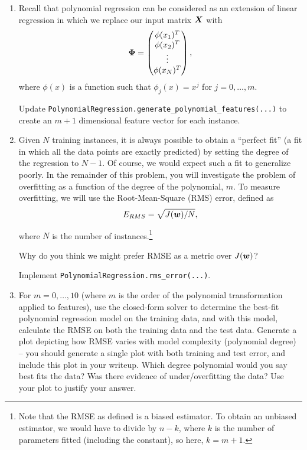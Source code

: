 \documentclass[11pt]{article}
\begin{document}
\begin{enumerate}[resume]

\item Recall that polynomial regression can be considered as an extension of linear regression in which we replace our input matrix $\boldsymbol{X}$ with
\begin{equation*}
\boldsymbol{\Phi} = \begin{pmatrix}
\phi(x_{1})^T  \\
\phi(x_{2})^T  \\
\vdots  \\
\phi(x_{N})^T \\
\end{pmatrix},
\end{equation*}
where $\phi(x)$ is a function such that $\phi_j(x) = x^j$ for $j = 0, \ldots, m$.

Update \verb|PolynomialRegression.generate_polynomial_features(...)| to create an $m+1$ dimensional feature vector for each instance. 

\solution{}

\item Given $N$ training instances, it is always possible to obtain a ``perfect fit'' (a fit in which all the data points are exactly predicted) by setting the degree of the regression to $N-1$. Of course, we would expect such a fit to generalize poorly. In the remainder of this problem, you will investigate the problem of overfitting as a function of the degree of the polynomial, $m$. To measure overfitting, we will use the Root-Mean-Square (RMS) error, defined as 
\begin{equation*}
E_{RMS} = \sqrt{J(\boldsymbol{w}) / N},
\end{equation*}

where $N$ is the number of instances.\footnote{Note that the RMSE as defined is a biased estimator. To obtain an unbiased estimator, we would have to divide by $n-k$, where $k$ is the number of parameters fitted (including the constant), so here, $k = m+1$.}

Why do you think we might prefer RMSE as a metric over $J(\boldsymbol{w})$?

Implement \verb|PolynomialRegression.rms_error(...)|. 

\solution{
}

\item For $m = 0, \ldots, 10$ (where $m$ is the order of the polynomial transformation applied to features), use the closed-form solver to determine the best-fit polynomial regression model on the training data, and with this model, calculate the RMSE on both the training data and the test data. Generate a plot depicting how RMSE varies with model complexity (polynomial degree) -- you should generate a single plot with both training and test error, and include this plot in your writeup. Which degree polynomial would you say best fits the data? Was there evidence of under/overfitting the data? Use your plot to justify your answer. 

\solution{
}

\end{enumerate}
\end{document}
